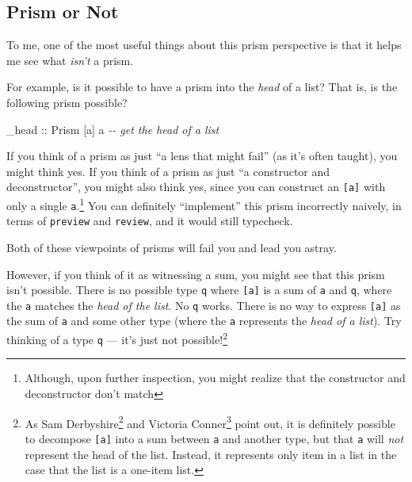 \documentclass[]{article}
\newenvironment{Shaded}{}{}
\newcommand{\CommentTok}[1]{\textcolor[rgb]{0.38,0.63,0.69}{\textit{#1}}}
\newcommand{\DataTypeTok}[1]{\textcolor[rgb]{0.56,0.13,0.00}{#1}}
\newcommand{\NormalTok}[1]{#1}
\newcommand{\OtherTok}[1]{\textcolor[rgb]{0.00,0.44,0.13}{#1}}
\renewcommand{\href}[2]{#2\footnote{\url{#1}}}
\begin{document}
\subsection{Prism or Not}\label{prism-or-not}

To me, one of the most useful things about this prism perspective is that it
helps me see what \emph{isn't} a prism.

For example, is it possible to have a prism into the \emph{head} of a list? That
is, is the following prism possible?

\begin{Shaded}
\begin{Highlighting}[]
\OtherTok{\_head ::} \DataTypeTok{Prism\textquotesingle{}}\NormalTok{ [a] a           }\CommentTok{{-}{-} get the head of a list}
\end{Highlighting}
\end{Shaded}

If you think of a prism as just ``a lens that might fail'' (as it's often
taught), you might think yes. If you think of a prism as just ``a constructor
and deconstructor'', you might also think yes, since you can construct an
\texttt{{[}a{]}} with only a single \texttt{a}.\footnote{Although, upon further
  inspection, you might realize that the constructor and deconstructor don't
  match} You can definitely ``implement'' this prism incorrectly naively, in
terms of \texttt{preview} and \texttt{review}, and it would still typecheck.

Both of these viewpoints of prisms will fail you and lead you astray.

However, if you think of it as witnessing a sum, you might see that this prism
isn't possible. There is no possible type \texttt{q} where \texttt{{[}a{]}} is a
sum of \texttt{a} and \texttt{q}, where the \texttt{a} matches the \emph{head of
the list}. No \texttt{q} works. There is no way to express \texttt{{[}a{]}} as
the sum of \texttt{a} and some other type (where the \texttt{a} represents the
\emph{head of a list}). Try thinking of a type \texttt{q} --- it's just not
possible!\footnote{As
  \href{https://twitter.com/samderbyshire/status/1006290478395019265}{Sam
  Derbyshire} and \href{http://disq.us/p/1t5xi3w}{Victoria Conner} point out, it
  is definitely possible to decompose \texttt{{[}a{]}} into a sum between
  \texttt{a} and another type, but that \texttt{a} will \emph{not} represent the
  head of the list. Instead, it represents only item in a list in the case that
  the list is a one-item list.}
\end{document}
